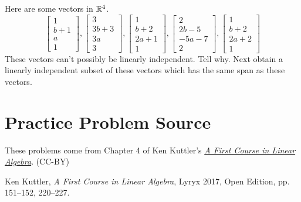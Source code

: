\documentclass{ximera}
\begin{document}
\begin{problem}\label{prb:3.35} Here are some vectors in $\mathbb{R}^{4}$.
\begin{equation*}
\left[
\begin{array}{r}
1 \\
b+1 \\
a \\
1
\end{array}
\right] ,\left[
\begin{array}{r}
3 \\
3b+3 \\
3a \\
3
\end{array}
\right] ,\left[
\begin{array}{r}
1 \\
b+2 \\
2a+1 \\
1
\end{array}
\right] ,\left[
\begin{array}{r}
2 \\
2b-5 \\
-5a-7 \\
2
\end{array}
\right] ,\left[
\begin{array}{r}
1 \\
b+2 \\
2a+2 \\
1
\end{array}
\right]
\end{equation*}
These vectors can't possibly be linearly independent. Tell why. Next obtain a
linearly independent subset of these vectors which has the same span as
these vectors. 
\end{problem}


\section*{Practice Problem Source}
These problems come from Chapter 4 of Ken Kuttler's \href{https://open.umn.edu/opentextbooks/textbooks/a-first-course-in-linear-algebra-2017}{\it A First Course in Linear Algebra}. (CC-BY)

Ken Kuttler, {\it  A First Course in Linear Algebra}, Lyryx 2017, Open Edition, pp. 151--152, 220--227.  
\end{document}
